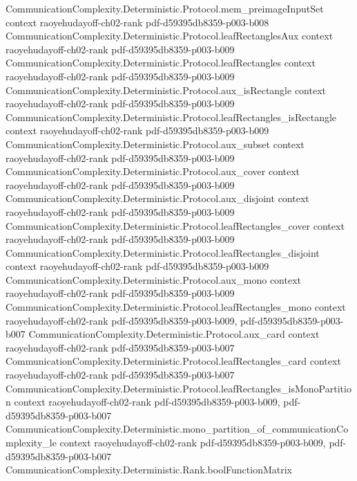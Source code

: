 \begin{theorem}
\proofstep
  {CommunicationComplexity.Deterministic.Protocol.mem_preimageInputSet}
  {context}
  {raoyehudayoff-ch02-rank}
  {pdf-d59395db8359-p003-b008}
\proofstep
  {CommunicationComplexity.Deterministic.Protocol.leafRectanglesAux}
  {context}
  {raoyehudayoff-ch02-rank}
  {pdf-d59395db8359-p003-b009}
\proofstep
  {CommunicationComplexity.Deterministic.Protocol.leafRectangles}
  {context}
  {raoyehudayoff-ch02-rank}
  {pdf-d59395db8359-p003-b009}
\proofstep
  {CommunicationComplexity.Deterministic.Protocol.aux_isRectangle}
  {context}
  {raoyehudayoff-ch02-rank}
  {pdf-d59395db8359-p003-b009}
\proofstep
  {CommunicationComplexity.Deterministic.Protocol.leafRectangles_isRectangle}
  {context}
  {raoyehudayoff-ch02-rank}
  {pdf-d59395db8359-p003-b009}
\proofstep
  {CommunicationComplexity.Deterministic.Protocol.aux_subset}
  {context}
  {raoyehudayoff-ch02-rank}
  {pdf-d59395db8359-p003-b009}
\proofstep
  {CommunicationComplexity.Deterministic.Protocol.aux_cover}
  {context}
  {raoyehudayoff-ch02-rank}
  {pdf-d59395db8359-p003-b009}
\proofstep
  {CommunicationComplexity.Deterministic.Protocol.aux_disjoint}
  {context}
  {raoyehudayoff-ch02-rank}
  {pdf-d59395db8359-p003-b009}
\proofstep
  {CommunicationComplexity.Deterministic.Protocol.leafRectangles_cover}
  {context}
  {raoyehudayoff-ch02-rank}
  {pdf-d59395db8359-p003-b009}
\proofstep
  {CommunicationComplexity.Deterministic.Protocol.leafRectangles_disjoint}
  {context}
  {raoyehudayoff-ch02-rank}
  {pdf-d59395db8359-p003-b009}
\proofstep
  {CommunicationComplexity.Deterministic.Protocol.aux_mono}
  {context}
  {raoyehudayoff-ch02-rank}
  {pdf-d59395db8359-p003-b009}
\proofstep
  {CommunicationComplexity.Deterministic.Protocol.leafRectangles_mono}
  {context}
  {raoyehudayoff-ch02-rank}
  {pdf-d59395db8359-p003-b009,
    pdf-d59395db8359-p003-b007}
\proofstep
  {CommunicationComplexity.Deterministic.Protocol.aux_card}
  {context}
  {raoyehudayoff-ch02-rank}
  {pdf-d59395db8359-p003-b007}
\proofstep
  {CommunicationComplexity.Deterministic.Protocol.leafRectangles_card}
  {context}
  {raoyehudayoff-ch02-rank}
  {pdf-d59395db8359-p003-b007}
\proofstep
  {CommunicationComplexity.Deterministic.Protocol.leafRectangles_isMonoPartition}
  {context}
  {raoyehudayoff-ch02-rank}
  {pdf-d59395db8359-p003-b009,
    pdf-d59395db8359-p003-b007}
\proofstep
  {CommunicationComplexity.Deterministic.mono_partition_of_communicationComplexity_le}
  {context}
  {raoyehudayoff-ch02-rank}
  {pdf-d59395db8359-p003-b009,
    pdf-d59395db8359-p003-b007}
\proofstep
  {CommunicationComplexity.Deterministic.Rank.boolFunctionMatrix}

\end{theorem}
